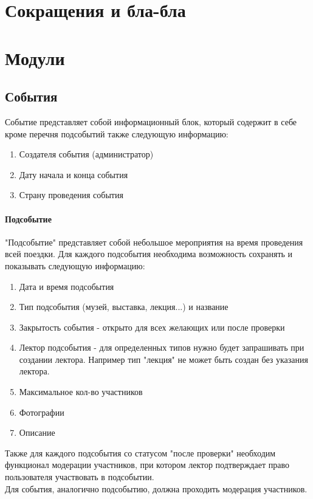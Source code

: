 \documentclass[DIV=calc, paper=a4, fontsize=11pt]{scrartcl} %
\begin{document}
\section{Сокращения и бла-бла}


\section{Модули}

\subsection{События}
Событие представляет собой информационный блок, который содержит в себе кроме перечня подсобытий также следующую информацию:

    \begin{enumerate}
        \item Создателя события (администратор) 
        \item Дату начала и конца события
        \item Страну проведения события 
    \end{enumerate}
    
\paragraph{Подсобытие}
"Подсобытие" представляет собой небольшое мероприятия на время проведения всей поездки. Для каждого подсобытия необходима возможность сохранять и показывать следующую информацию:

    \begin{enumerate}
        \item Дата и время подсобытия
        \item Тип подсобытия (музей, выставка, лекция...) и название
        \item Закрытость события - открыто для всех желающих или после проверки
        \item Лектор подсобытия - для определенных типов нужно будет запрашивать при создании лектора. Например тип "лекция" не может быть создан без указания лектора.
        \item Максимальное кол-во участников
        \item Фотографии
        \item Описание
    \end{enumerate}
Также для каждого подсобытия со статусом "после проверки" необходим функционал модерации участников, при котором лектор  подтверждает право пользователя участвовать в подсобытии.
\\[0.5cm]
Для события, аналогично подсобытию, должна проходить модерация участников.
\end{document}
